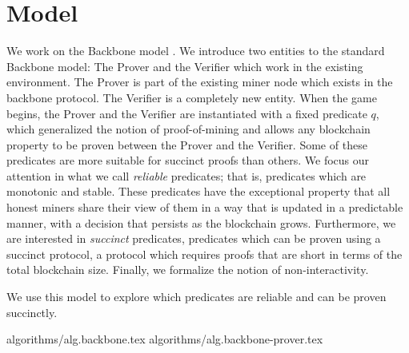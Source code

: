 \section{Model}

We work on the Backbone model \cite{backbone}. We introduce two entities to
the standard Backbone model: The Prover and the Verifier which work in the
existing environment. The Prover is part of the existing miner node which
exists in the backbone protocol. The Verifier is a completely new entity. When
the game begins, the Prover and the Verifier are instantiated with a fixed
predicate $q$, which generalized the notion of proof-of-mining and allows any
blockchain property to be proven between the Prover and the Verifier. Some of
these predicates are more suitable for succinct proofs than others. We focus
our attention in what we call \textit{ reliable} predicates; that is,
predicates which are monotonic and stable.  These predicates have the
exceptional property that all honest miners share their view of them in a way
that is updated in a predictable manner, with a decision that persists as the
blockchain grows.  Furthermore, we are interested in \textit{succinct}
predicates, predicates which can be proven using a succinct protocol, a
protocol which requires proofs that are short in terms of the total blockchain
size. Finally, we formalize the notion of non-interactivity.

We use this model to explore which predicates are reliable and can be proven
succinctly.

{algorithms/alg.backbone.tex}
{algorithms/alg.backbone-prover.tex}
